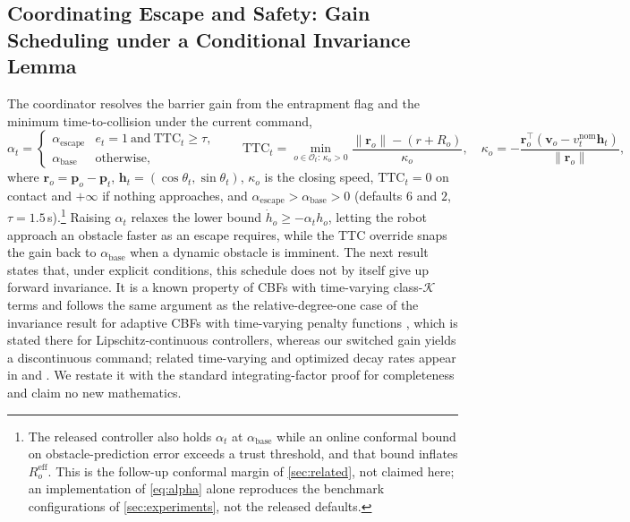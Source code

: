 \subsection{Coordinating Escape and Safety: Gain Scheduling under a Conditional Invariance Lemma}\label{sec:coord}

The coordinator resolves the barrier gain from the entrapment flag and the minimum time-to-collision under the current command,
\begin{equation}\label{eq:alpha}
\alpha_t=\begin{cases}\alpha_{\mathrm{escape}} & e_t=1\ \text{and}\ \mathrm{TTC}_t\ge\tau,\\ \alpha_{\mathrm{base}} & \text{otherwise},\end{cases}\qquad
\mathrm{TTC}_t=\min_{o\in\mathcal{O}_t:\,\kappa_o>0}\frac{\|\mathbf{r}_o\|-(r+R_o)}{\kappa_o},\quad
\kappa_o=-\frac{\mathbf{r}_o^{\top}(\mathbf{v}_o-v^{\mathrm{nom}}_t\mathbf{h}_t)}{\|\mathbf{r}_o\|},
\end{equation}
where $\mathbf{r}_o=\mathbf{p}_o-\mathbf{p}_t$, $\mathbf{h}_t=(\cos\theta_t,\sin\theta_t)$, $\kappa_o$ is the closing speed, $\mathrm{TTC}_t=0$ on contact and $+\infty$ if nothing approaches, and $\alpha_{\mathrm{escape}}>\alpha_{\mathrm{base}}>0$ (defaults $6$ and $2$, $\tau=1.5$\,s).\footnote{The released controller also holds $\alpha_t$ at $\alpha_{\mathrm{base}}$ while an online conformal bound on obstacle-prediction error exceeds a trust threshold, and that bound inflates $R^{\mathrm{eff}}_o$. This is the follow-up conformal margin of \cref{sec:related}, not claimed here; an implementation of \eqref{eq:alpha} alone reproduces the benchmark configurations of \cref{sec:experiments}, not the released defaults.} Raising $\alpha_t$ relaxes the lower bound $\dot h_o\ge-\alpha_t h_o$, letting the robot approach an obstacle faster as an escape requires, while the TTC override snaps the gain back to $\alpha_{\mathrm{base}}$ when a dynamic obstacle is imminent. The next result states that, under explicit conditions, this schedule does not by itself give up forward invariance. It is a known property of CBFs with time-varying class-$\mathcal{K}$ terms and follows the same argument as the relative-degree-one case of the invariance result for adaptive CBFs with time-varying penalty functions \citep[Thm.~3]{ada_cbf}, which is stated there for Lipschitz-continuous controllers, whereas our switched gain yields a discontinuous command; related time-varying and optimized decay rates appear in \citet{optdecay_cbf} and \citet{rt_cbf}. We restate it with the standard integrating-factor proof for completeness and claim no new mathematics.

